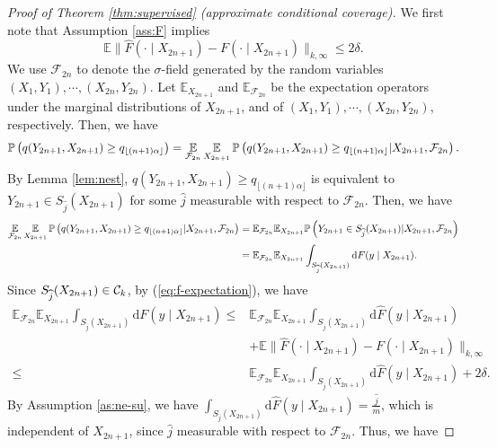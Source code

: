 \begin{proof}[Proof of Theorem \ref{thm:supervised} (approximate conditional coverage)]
We first note that Assumption \ref{ass:F} implies
\begin{equation}
\mathbb{E}\|\widehat{F}(\cdot \mid X_{2n+1})-F(\cdot \mid X_{2n+1})\|_{k,\infty}\leq 2\delta.\label{eq:f-expectation}
\end{equation}
We use $\mathcal{F}_{2n}$ to denote the $\sigma$-field generated by the random variables $(X_1,Y_1),\cdots, (X_{2n},Y_{2n})$. Let $\mathbb{E}_{X_{2n+1}}$ and $\mathbb{E}_{\mathcal{F}_{2n}}$ be the expectation operators under the marginal distributions of $X_{2n+1}$, and of $(X_1,Y_1),\cdots, (X_{2n},Y_{2n})$, respectively. Then, we have
\begin{align*}
\mathbb{P}\left(q(Y_{2n+1},X_{2n+1})\geq q_{\lfloor(n+1)\alpha\rfloor}\right) = \operatorname*{\mathbb{E}}_{\mathcal{F}_{2n}}\operatorname*{\mathbb{E}}_{X_{2n+1}}\mathbb{P}\left(q(Y_{2n+1},X_{2n+1}) 
\geq q_{\lfloor(n+1)\alpha\rfloor}| X_{2n+1},\mathcal{F}_{2n}\right). 
\end{align*}
By Lemma \ref{lem:nest}, $q(Y_{2n+1},X_{2n+1})\geq q_{\lfloor(n+1)\alpha\rfloor}$ is equivalent to $Y_{2n+1}\in S_{\widehat{j}}(X_{2n+1})$ for some $\widehat{j}$ measurable with respect to $\mathcal{F}_{2n}$. Then, we have
\begin{align*}
\operatorname*{\mathbb{E}}_{\mathcal{F}_{2n}}\operatorname*{\mathbb{E}}_{X_{2n+1}}\mathbb{P}\left(q(Y_{2n+1},X_{2n+1})\geq q_{\lfloor(n+1)\alpha\rfloor}|X_{2n+1},\mathcal{F}_{2n}\right) &=\mathbb{E}_{\mathcal{F}_{2n}}\mathbb{E}_{X_{2n+1}}\mathbb{P}\left(Y_{2n+1}\in S_{\widehat{j}}(X_{2n+1})|X_{2n+1},\mathcal{F}_{2n}\right) \\
&=\mathbb{E}_{\mathcal{F}_{2n}}\mathbb{E}_{X_{2n+1}}\int_{S_{\widehat{j}}(X_{2n+1})} \mathrm{d} F(y\mid X_{2n+1}). 
\end{align*}
Since $S_{\widehat{j}}(X_{2n+1}) \in \mathcal{C}_k$, by (\ref{eq:f-expectation}), we have 
\begin{align*}
\mathbb{E}_{\mathcal{F}_{2n}}\mathbb{E}_{X_{2n+1}}\int_{S_{\widehat{j}}(X_{2n+1})} \mathrm{d} F(y\mid X_{2n+1}) 
\leq& \mathbb{E}_{\mathcal{F}_{2n}}\mathbb{E}_{X_{2n+1}}\int_{S_{\widehat{j}}(X_{2n+1})} \mathrm{d}\widehat{F}(y \mid X_{2n+1}) \\
&+ \mathbb{E}\|\widehat{F}(\cdot \mid X_{2n+1})-F(\cdot \mid X_{2n+1})\|_{k,\infty} \\
\leq& \mathbb{E}_{\mathcal{F}_{2n}}\mathbb{E}_{X_{2n+1}}\int_{S_{\widehat{j}}(X_{2n+1})} \mathrm{d}\widehat{F}(y \mid X_{2n+1}) + 2\delta.
\end{align*}
By Assumption \ref{as:ne-su}, we have $\int_{S_{\widehat{j}}(X_{2n+1})}\mathrm{d}\widehat{F}(y \mid X_{2n+1})=\frac{\widehat{j}}{m}$, which is independent of $X_{2n+1}$, since $\widehat{j}$ measurable with respect to $\mathcal{F}_{2n}$. Thus, we have 

\end{proof}
